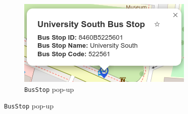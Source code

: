 \documentclass[a4paper,11pt]{report}
\begin{document}
\begin{figure}[H]
\begin{subfigure}[c]{0.3\textwidth}
        \centering
        \includegraphics[width=\textwidth]{./images/busstoppopup.png}
        \caption{\texttt{BusStop} pop-up}
    \end{subfigure}

    \vspace{0.5cm} %


\end{figure}
\end{document}
